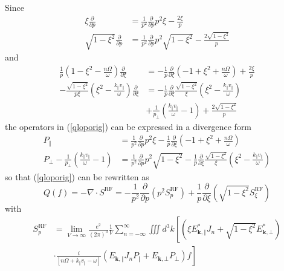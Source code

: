 Since
\begin{align}
\xi\frac{\partial}{\partial p}  &  =\frac{1}{p^{2}}\frac{\partial}{\partial
p}p^{2}\xi-\frac{2\xi}{p}\\
\sqrt{1-\xi^{2}}\frac{\partial}{\partial p}  &  =\frac{1}{p^{2}}\frac
{\partial}{\partial p}p^{2}\sqrt{1-\xi^{2}}-\frac{2\sqrt{1-\xi^{2}}}{p}%
\end{align}
and
\begin{align}
\frac{1}{p}\left(  1-\xi^{2}-\frac{n\Omega}{\omega}\right)  \frac{\partial
}{\partial\xi}  &  =-\frac{1}{p}\frac{\partial}{\partial\xi}\left(  -1+\xi
^{2}+\frac{n\Omega}{\omega}\right)  +\frac{2\xi}{p}\\
-\frac{\sqrt{1-\xi^{2}}}{p\xi}\left(  \xi^{2}-\frac{k_{\Vert}v_{\Vert}}%
{\omega}\right)  \frac{\partial}{\partial\xi}  &  =-\frac{1}{p}\frac{\partial
}{\partial\xi}\frac{\sqrt{1-\xi^{2}}}{\xi}\left(  \xi^{2}-\frac{k_{\Vert
}v_{\Vert}}{\omega}\right) \nonumber\\
&  +\frac{1}{p_{\bot}}\left(  \frac{k_{\Vert}v_{\Vert}}{\omega}-1\right)
+\frac{2\sqrt{1-\xi^{2}}}{p}%
\end{align}
the operators in (\ref{qloporig}) can be expressed in a divergence form
\begin{align}
P_{\Vert}  &  =\frac{1}{p^{2}}\frac{\partial}{\partial p}p^{2}\xi-\frac{1}%
{p}\frac{\partial}{\partial\xi}\left(  -1+\xi^{2}+\frac{n\Omega}{\omega
}\right) \\
P_{\bot}-\frac{1}{p_{\bot}}\left(  \frac{k_{\Vert}v_{\Vert}}{\omega
}-1\right)   &  =\frac{1}{p^{2}}\frac{\partial}{\partial p}p^{2}\sqrt
{1-\xi^{2}}-\frac{1}{p}\frac{\partial}{\partial\xi}\frac{\sqrt{1-\xi^{2}}}%
{\xi}\left(  \xi^{2}-\frac{k_{\Vert}v_{\Vert}}{\omega}\right)
\end{align}
so that (\ref{qloporig}) can be rewritten as
\begin{equation}
Q\left(  f\right)  =-\nabla\cdot S^{\text{RF}}=-\frac{1}{p^{2}}\frac{\partial
}{\partial p}\left(  p^{2}S_{p}^{\text{RF}}\right)  +\frac{1}{p}\frac
{\partial}{\partial\xi}\left(  \sqrt{1-\xi^{2}}S_{\xi}^{\text{RF}}\right)
\end{equation}
with
\begin{align}
S_{p}^{\text{RF}}  &  =\lim_{V\rightarrow\infty}\frac{e^{2}}{\left(
2\pi\right)  ^{3}}\frac{1}{V}\sum_{n=-\infty}^{\infty}\iiint d^{3}k\left[
\left(  \xi E_{\mathbf{k},\Vert}^{\ast}J_{n}+\sqrt{1-\xi^{2}}E_{\mathbf{k}%
,\bot}^{\ast}\right)  \right. \nonumber\\
&  \left.  \cdot\frac{i}{\left[  n\Omega+k_{\Vert}v_{\Vert}-\omega\right]
}\left(  E_{\mathbf{k},\Vert}J_{n}P_{\Vert}+E_{\mathbf{k},\bot}P_{\bot
}\right)  f\right]  \label{fluxRFp}%
\end{align}%
